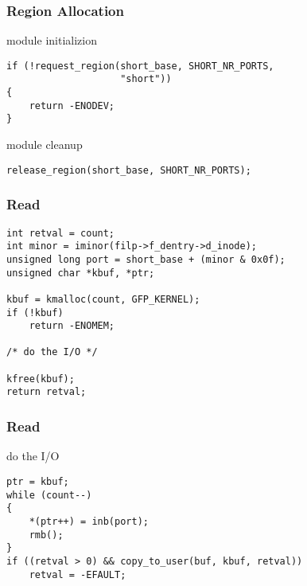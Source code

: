 \documentclass[dvipsnames]{beamer}
\begin{document}
\begin{frame}[fragile]
  \frametitle{Region Allocation}

  \begin{exampleblock}{module initializion}
    \begin{lstlisting}
if (!request_region(short_base, SHORT_NR_PORTS,
                    "short"))
{
    return -ENODEV;
}
    \end{lstlisting}
  \end{exampleblock}

  \begin{exampleblock}{module cleanup}
    \begin{lstlisting}
release_region(short_base, SHORT_NR_PORTS);
    \end{lstlisting}
  \end{exampleblock}
\end{frame}
%
%
%

\begin{frame}[fragile]
  \frametitle{Read}

  \begin{exampleblock}{}
    \begin{lstlisting}
int retval = count;
int minor = iminor(filp->f_dentry->d_inode);
unsigned long port = short_base + (minor & 0x0f);
unsigned char *kbuf, *ptr;

kbuf = kmalloc(count, GFP_KERNEL);
if (!kbuf)
    return -ENOMEM;

/* do the I/O */

kfree(kbuf);
return retval;
    \end{lstlisting}
  \end{exampleblock}
\end{frame}

\begin{frame}[fragile]
  \frametitle{Read}

  \begin{exampleblock}{do the I/O}
    \begin{lstlisting}
ptr = kbuf;
while (count--)
{
    *(ptr++) = inb(port);
    rmb();
}
if ((retval > 0) && copy_to_user(buf, kbuf, retval))
    retval = -EFAULT;
    \end{lstlisting}
  \end{exampleblock}
\end{frame}
\end{document}
